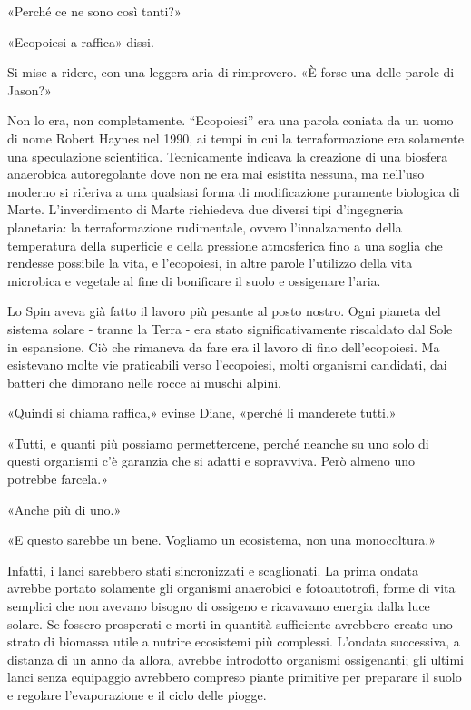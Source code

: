 «Perché ce ne sono così tanti?»

«Ecopoiesi a raffica» dissi.

Si mise a ridere, con una leggera aria di rimprovero. «È forse una delle
parole di Jason?»

Non lo era, non completamente. ``Ecopoiesi'' era una parola coniata da
un uomo di nome Robert Haynes nel 1990, ai tempi in cui la
terraformazione era solamente una speculazione scientifica. Tecnicamente
indicava la creazione di una biosfera anaerobica autoregolante dove non
ne era mai esistita nessuna, ma nell'uso moderno si riferiva a una
qualsiasi forma di modificazione puramente biologica di Marte.
L'inverdimento di Marte richiedeva due diversi tipi d'ingegneria
planetaria: la terraformazione rudimentale, ovvero l'innalzamento della
temperatura della superficie e della pressione atmosferica fino a una
soglia che rendesse possibile la vita, e l'ecopoiesi, in altre parole
l'utilizzo della vita microbica e vegetale al fine di bonificare il
suolo e ossigenare l'aria.

Lo Spin aveva già fatto il lavoro più pesante al posto nostro. Ogni
pianeta del sistema solare - tranne la Terra - era stato
significativamente riscaldato dal Sole in espansione. Ciò che rimaneva
da fare era il lavoro di fino dell'ecopoiesi. Ma esistevano molte vie
praticabili verso l'ecopoiesi, molti organismi candidati, dai batteri
che dimorano nelle rocce ai muschi alpini.

«Quindi si chiama raffica,» evinse Diane, «perché li manderete tutti.»

«Tutti, e quanti più possiamo permettercene, perché neanche su uno solo
di questi organismi c'è garanzia che si adatti e sopravviva. Però almeno
uno potrebbe farcela.»

«Anche più di uno.»

«E questo sarebbe un bene. Vogliamo un ecosistema, non una monocoltura.»

Infatti, i lanci sarebbero stati sincronizzati e scaglionati. La prima
ondata avrebbe portato solamente gli organismi anaerobici e
fotoautotrofi, forme di vita semplici che non avevano bisogno di
ossigeno e ricavavano energia dalla luce solare. Se fossero prosperati e
morti in quantità sufficiente avrebbero creato uno strato di biomassa
utile a nutrire ecosistemi più complessi. L'ondata successiva, a
distanza di un anno da allora, avrebbe introdotto organismi ossigenanti;
gli ultimi lanci senza equipaggio avrebbero compreso piante primitive
per preparare il suolo e regolare l'evaporazione e il ciclo delle
piogge.

